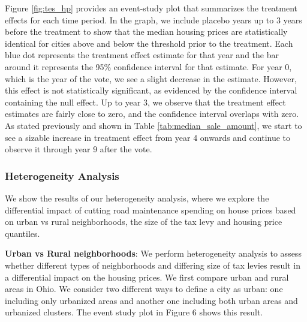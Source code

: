 Figure \ref{fig:tes_hp} provides an event-study plot that summarizes the treatment effects for each time period. In the graph, we include placebo years up to 3 years before the treatment to show that the median housing prices are statistically identical for cities above and below the threshold prior to the treatment. Each blue dot represents the treatment effect estimate for that year and the bar around it represents the 95\% confidence interval for that estimate. For year 0, which is the year of the vote, we see a slight decrease in the estimate. However, this effect is not statistically significant, as evidenced by the confidence interval containing the null effect. Up to year 3, we observe that the treatment effect estimates are fairly close to zero, and the confidence interval overlaps with zero. As stated previously and shown in Table \ref{tab:median_sale_amount}, we start to see a sizable increase in treatment effect from year 4 onwards and continue to observe it through year 9 after the vote. 
 
\subsubsection{Heterogeneity Analysis} We show the results of our heterogeneity analysis, where we explore the differential impact of cutting road maintenance spending on house prices based on urban vs rural neighborhoods, the size of the tax levy and housing price quantiles.

\vskip 0.5cm

\textbf{Urban vs Rural neighborhoods}: We perform heterogeneity analysis to assess whether different types of neighborhoods and differing size of tax levies result in a differential impact on the housing prices. We first compare urban and rural areas in Ohio. We consider two different ways to define a city as urban:  one including only urbanized areas and another one including both urban areas and urbanized clusters. The event study plot in Figure 6 shows this result. 

